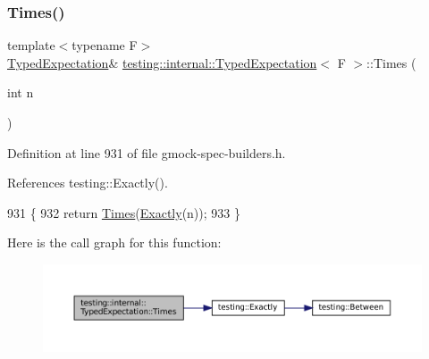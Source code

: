 \subsubsection{\texorpdfstring{Times()}{Times()}\hspace{0.1cm}{\footnotesize\ttfamily [2/2]}}
{\footnotesize\ttfamily template$<$typename F$>$ \\
\hyperlink{classtesting_1_1internal_1_1TypedExpectation}{Typed\+Expectation}\& \hyperlink{classtesting_1_1internal_1_1TypedExpectation}{testing\+::internal\+::\+Typed\+Expectation}$<$ F $>$\+::Times (\begin{DoxyParamCaption}\item[{int}]{n }\end{DoxyParamCaption})\hspace{0.3cm}{\ttfamily [inline]}}



Definition at line 931 of file gmock-\/spec-\/builders.\+h.



References testing\+::\+Exactly().


\begin{DoxyCode}
931                                  \{
932     \textcolor{keywordflow}{return} \hyperlink{classtesting_1_1internal_1_1TypedExpectation_a9a4c34ee5c6e6adc880a22f61f33da57}{Times}(\hyperlink{namespacetesting_aa9b1b32ba9e8d3db8ac0af0fc8785c8d}{Exactly}(n));
933   \}
\end{DoxyCode}
Here is the call graph for this function\+:
\nopagebreak
\begin{figure}[H]
\begin{center}
\leavevmode
\includegraphics[width=350pt]{classtesting_1_1internal_1_1TypedExpectation_a92d56ee785d38ec8193aed2a0fcbccf0_cgraph}
\end{center}
\end{figure}
\mbox{\label{classtesting_1_1internal_1_1TypedExpectation_a41b0d15e44e95d52f4d5c310fb9e9683}} 
